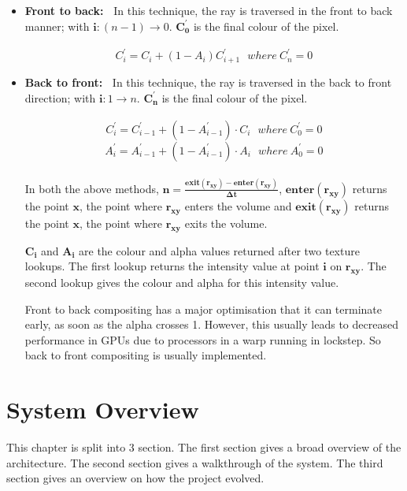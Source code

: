 \documentclass[letterpaper,11pt]{report}
\def\rxy{\bm{r_{xy}}}
\def\dt{\bm{\Delta t}}
\begin{document}
\begin{itemize}
    \item \textbf{Front to back:\ }
        In this technique, the ray is traversed in the front to back manner; with $\bm{i}: (n-1) \xrightarrow[]{} 0$. $\bm{C^\prime_0}$ is the final colour of the pixel.

        \[ C^\prime_i = C_i + (1 - A_i)C^\prime_{i+1} \ \ \  where\ C^\prime_n = 0 \]

    \item \textbf{Back to front:\ }
        In this technique, the ray is traversed in the back to front direction; with $\bm{i}: 1 \xrightarrow[]{} n$.  $\bm{C^\prime_n}$ is the final colour of the pixel.

        \[ C^\prime_i = C^\prime_{i-1} + (1 - A^\prime_{i-1}) \cdot C_i \ \ \ where\ C^\prime_0 = 0 \]
        \[ A^\prime_i = A^\prime_{i-1} + (1 - A^\prime_{i-1}) \cdot A_i \ \ \ where\ A^\prime_0 = 0 \]
\\


    In both the above methods, $\bm{n} = \frac{\bm{exit(\rxy)} - \bm{enter(\rxy)}}{\dt}$,
        $\bm{enter(\rxy)}$ returns the point $\bm{x}$, the point where $\rxy$ enters the volume and
        $\bm{exit(\rxy)}$ returns the point $\bm{x}$, the point where $\rxy$ exits the volume.

    \newpage

    $\bm{C_i}$ and $\bm{A_i}$ are the colour and alpha values returned after two texture lookups. The first lookup returns the intensity value at point $\bm{i}$ on $\rxy$. The second lookup gives the colour and alpha for this intensity value. \newline

    Front to back compositing has a major optimisation that it can terminate early, as soon as the alpha crosses 1. However, this usually leads to decreased performance in GPUs due to processors in a warp running in lockstep. So back to front compositing is usually implemented.

\end{itemize}




\chapter{System Overview}

This chapter is split into 3 section. The first section gives a broad overview of the architecture. The second section gives a walkthrough of the system. The third section gives an overview on how the project evolved.
\end{document}
